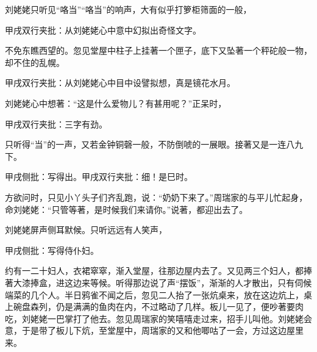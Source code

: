 \begin{parag}

    刘姥姥只听见“咯当”“咯当”的响声，大有似乎打箩柜筛面的一般，\begin{note}甲戌双行夹批：从刘姥姥心中意中幻拟出奇怪文字。\end{note}不免东瞧西望的。忽见堂屋中柱子上挂著一个匣子，底下又坠著一个秤砣般一物，却不住的乱幌。\begin{note}甲戌双行夹批：从刘姥姥心中目中设譬拟想，真是镜花水月。\end{note}刘姥姥心中想著：“这是什么爱物儿？有甚用呢？”正呆时，\begin{note}甲戌双行夹批：三字有劲。\end{note}只听得“当”的一声，又若金钟铜磬一般，不防倒唬的一展眼。接著又是一连八九下。\begin{note}甲戌侧批：写得出。甲戌双行夹批：细！是巳时。\end{note}方欲问时，只见小丫头子们齐乱跑，说：“奶奶下来了。”周瑞家的与平儿忙起身，命刘姥姥：“只管等著，是时候我们来请你。”说著，都迎出去了。
\end{parag}


\begin{parag}

    刘姥姥屏声侧耳默候。只听远远有人笑声，\begin{note}甲戌侧批：写得侍仆妇。\end{note}约有一二十妇人，衣裙窣窣，渐入堂屋，往那边屋内去了。又见两三个妇人，都捧著大漆捧盒，进这边来等候。听得那边说了声“摆饭”，渐渐的人才散出，只有伺候端菜的几个人。半日鸦雀不闻之后，忽见二人抬了一张炕桌来，放在这边炕上，桌上碗盘森列，仍是满满的鱼肉在内，不过略动了几样。板儿一见了，便吵著要肉吃，刘姥姥一巴掌打了他去。忽见周瑞家的笑嘻嘻走过来，招手儿叫他。刘姥姥会意，于是带了板儿下炕，至堂屋中，周瑞家的又和他唧咕了一会，方过这边屋里来。
\end{parag}


